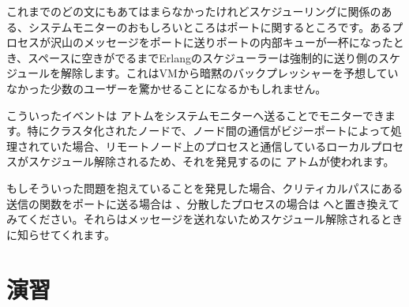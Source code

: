 これまでのどの文にもあてはまらなかったけれどスケジューリングに関係のある、システムモニターのおもしろいところはポートに関するところです。あるプロセスが沢山のメッセージをポートに送りポートの内部キューが一杯になったとき、スペースに空きがでるまでErlangのスケジューラーは強制的に送り側のスケジュールを解除します。これはVMから暗黙のバックプレッシャーを予想していなかった少数のユーザーを驚かせることになるかもしれません。

こういったイベントは  アトムをシステムモニターへ送ることでモニターできます。特にクラスタ化されたノードで、ノード間の通信がビジーポートによって処理されていた場合、リモートノード上のプロセスと通信しているローカルプロセスがスケジュール解除されるため、それを発見するのに  アトムが使われます。

もしそういった問題を抱えていることを発見した場合、クリティカルパスにある送信の関数をポートに送る場合は 、分散したプロセスの場合は  へと置き換えてみてください。それらはメッセージを送れないためスケジュール解除されるときに知らせてくれます。

\section{演習}

